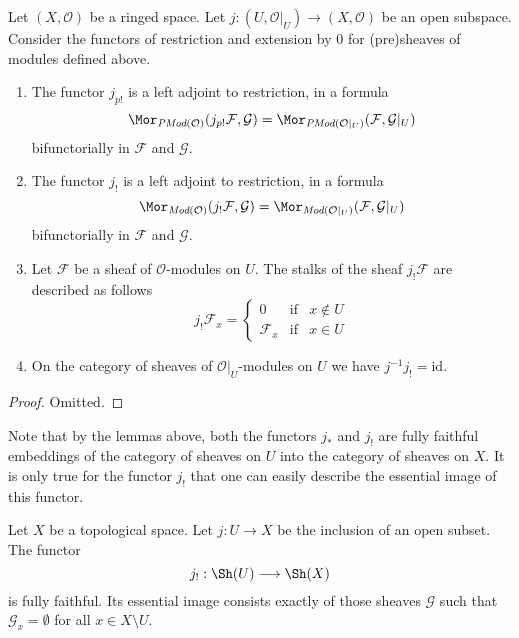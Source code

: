 \begin{lemma}
\label{lemma-j-shriek-modules}
Let $(X, \mathcal{O})$ be a ringed space.
Let $j : (U, \mathcal{O}|_U) \to (X, \mathcal{O})$
be an open subspace.
Consider the functors of restriction and extension
by $0$ for (pre)sheaves of modules defined above.
\begin{enumerate}
\item The functor $j_{p!}$ is a left adjoint to restriction,
in a formula
$$
\Mor_{\textit{PMod}(\mathcal{O})}(j_{p!}\mathcal{F}, \mathcal{G})
=
\Mor_{\textit{PMod}(\mathcal{O}|_U)}(\mathcal{F}, \mathcal{G}|_U)
$$
bifunctorially in $\mathcal{F}$ and $\mathcal{G}$.
\item The functor $j_!$ is a left adjoint to restriction,
in a formula
$$
\Mor_{\textit{Mod}(\mathcal{O})}(j_!\mathcal{F}, \mathcal{G})
=
\Mor_{\textit{Mod}(\mathcal{O}|_U)}(\mathcal{F}, \mathcal{G}|_U)
$$
bifunctorially in $\mathcal{F}$ and $\mathcal{G}$.
\item Let $\mathcal{F}$ be a sheaf of $\mathcal{O}$-modules on $U$.
The stalks of the sheaf $j_!\mathcal{F}$ are described
as follows
$$
j_{!}\mathcal{F}_x =
\left\{
\begin{matrix}
0 & \text{if} & x \not \in U \\
\mathcal{F}_x & \text{if} & x \in U
\end{matrix}
\right.
$$
\item On the category of sheaves of $\mathcal{O}|_U$-modules on $U$
we have $j^{-1}j_! = \text{id}$.
\end{enumerate}
\end{lemma}

\begin{proof}
Omitted.
\end{proof}

\noindent
Note that by the lemmas above, both the functors
$j_*$ and $j_!$ are fully faithful embeddings of
the category of sheaves on $U$ into the category
of sheaves on $X$. It is only true for the functor
$j_!$ that one can easily describe the essential
image of this functor.

\begin{lemma}
\label{lemma-equivalence-categories-open}
Let $X$ be a topological space.
Let $j : U \to X$ be the inclusion of an open subset.
The functor
$$
j_! : \Sh(U) \longrightarrow \Sh(X)
$$
is fully faithful. Its essential image consists exactly
of those sheaves $\mathcal{G}$ such that
$\mathcal{G}_x = \emptyset$ for all $x \in X \setminus U$.
\end{lemma}

